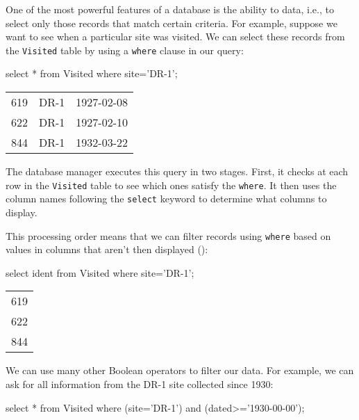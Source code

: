 \documentclass{book}
\begin{document}
One of the most powerful features of a database is the ability to
 data, i.e., to select only those records
that match certain criteria. For example, suppose we want to see when a
particular site was visited. We can select these records from the
\texttt{Visited} table by using a \texttt{where} clause in our query:

\begin{VerbIn}
\end{VerbIn}

\begin{VerbIn}
select * from Visited where site='DR-1';
\end{VerbIn}

\begin{tabular}{lll}
619 & DR-1 & 1927-02-08 \\
622 & DR-1 & 1927-02-10 \\
844 & DR-1 & 1932-03-22 \\
\end{tabular}

The database manager executes this query in two stages. First, it checks
at each row in the \texttt{Visited} table to see which ones satisfy the
\texttt{where}. It then uses the column names following the
\texttt{select} keyword to determine what columns to display.

This processing order means that we can filter records using
\texttt{where} based on values in columns that aren't then displayed
():

\begin{VerbIn}
select ident from Visited where site='DR-1';
\end{VerbIn}

\begin{tabular}{l}
619 \\
622 \\
844 \\
\end{tabular}


We can use many other Boolean operators to filter our data. For example,
we can ask for all information from the DR-1 site collected since 1930:

\begin{VerbIn}
select * from Visited where (site='DR-1') and (dated>='1930-00-00');
\end{VerbIn}
\end{document}
